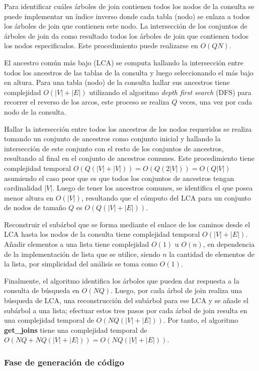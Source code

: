 Para identificar cu\'ales \'arboles de join contienen todos los nodos de la consulta se puede implementar un índice 
inverso donde cada tabla (nodo) se enlaza a todos los árboles de join que contienen 
este nodo. La intersección de los conjuntos de árboles de join da como resultado todos los árboles de join 
que contienen todos los nodos especificados. Este procedimiento puede realizarse en $O(QN)$. 

El ancestro común más bajo (LCA) se computa hallando la intersección entre todos los ancestros de las tablas de la consulta y luego 
seleccionando el m\'as bajo en altura. Para una tabla (nodo) de la consulta hallar sus ancestros 
tiene complejidad $O(|V| + |E|)$ utilizando el algoritmo \emph{depth first search} (DFS) para recorrer el reverso de los arcos, 
este proceso se realiza $Q$ veces, una vez por cada nodo de la consulta. 

Hallar la intersección 
entre todos los ancestros de los nodos requeridos se realiza tomando un conjunto de ancestros 
como conjunto inicial y hallando la intersección de este conjunto con el resto de los conjuntos de ancestros, 
resultando al final en el conjunto de ancestros comunes. Este procedimiento tiene complejidad temporal 
$O(Q(|V| + |V|)) = O(Q(2|V|)) = O(Q|V|)$ asumiendo el caso peor que es que todos los conjuntos de ancestros 
tengan cardinalidad $|V|$. Luego de tener los ancestros comunes, se identifica el que posea menor altura 
en $O(|V|)$, resultando que el cómputo del LCA para un conjunto de nodos de tamaño $Q$ es $O(Q(|V| + |E|))$.

Reconstruir el sub\'arbol que se forma mediante el enlace de los caminos desde el LCA hasta los nodos 
de la consulta tiene complejidad temporal $O(|V| + |E|)$. Añadir elementos a una lista tiene complejidad 
$O(1)$ u $O(n)$, en dependencia de la implementación de lista que se utilice, siendo $n$ la cantidad 
de elementos de la lista, por simplicidad del análisis se toma como $O(1)$.

Finalmente, el algoritmo identifica los \'arboles que pueden dar respuesta a la consulta de b\'usqueda en $O(NQ)$. Luego, por cada \'arbol de join realiza una búsqueda de LCA, 
una reconstrucción 
del sub\'arbol para ese LCA y se añade el sub\'arbol a una lista; efectuar estos tres pasos por cada \'arbol de join resulta en una complejidad temporal de 
$O(NQ(|V| + |E|))$. 
Por tanto, el algoritmo \textbf{get\_joins} tiene una complejidad 
temporal de $O(NQ + NQ(|V| + |E|)) = O(NQ(|V| + |E|))$.


\subsubsection{Fase de generaci\'on de c\'odigo}

